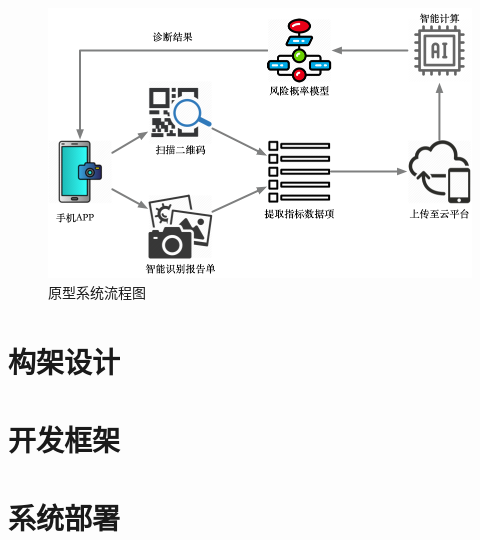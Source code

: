 \documentclass[UTF8,a4paper,12pt, onecolumn]{ctexart}
\begin{document}
\begin{figure}
	\centering
	\includegraphics[width=\textwidth]{images/prototype.png}
	\caption{原型系统流程图}
\end{figure}

\section{构架设计}



\section{开发框架}



\section{系统部署}


%

\appendix
\end{document}
